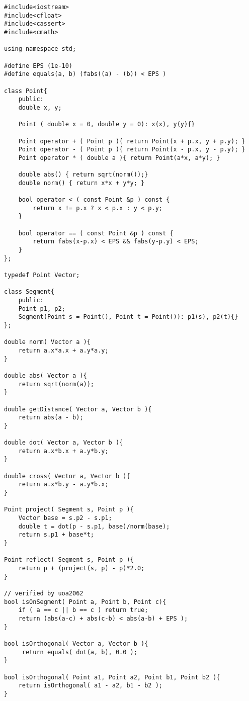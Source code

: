 \begin{verbatim}
#include<iostream>
#include<cfloat>
#include<cassert>
#include<cmath>

using namespace std;

#define EPS (1e-10)
#define equals(a, b) (fabs((a) - (b)) < EPS )

class Point{
    public:
    double x, y;
    
    Point ( double x = 0, double y = 0): x(x), y(y){}
    
    Point operator + ( Point p ){ return Point(x + p.x, y + p.y); }
    Point operator - ( Point p ){ return Point(x - p.x, y - p.y); }
    Point operator * ( double a ){ return Point(a*x, a*y); }

    double abs() { return sqrt(norm());}
    double norm() { return x*x + y*y; }

    bool operator < ( const Point &p ) const {
        return x != p.x ? x < p.x : y < p.y;
    }

    bool operator == ( const Point &p ) const {
        return fabs(x-p.x) < EPS && fabs(y-p.y) < EPS;
    }
};

typedef Point Vector;

class Segment{
    public:
    Point p1, p2;
    Segment(Point s = Point(), Point t = Point()): p1(s), p2(t){}
};

double norm( Vector a ){
    return a.x*a.x + a.y*a.y;
}

double abs( Vector a ){
    return sqrt(norm(a));
}

double getDistance( Vector a, Vector b ){
    return abs(a - b); 
}

double dot( Vector a, Vector b ){
    return a.x*b.x + a.y*b.y;
}

double cross( Vector a, Vector b ){
    return a.x*b.y - a.y*b.x;
}

Point project( Segment s, Point p ){
    Vector base = s.p2 - s.p1;
    double t = dot(p - s.p1, base)/norm(base);
    return s.p1 + base*t;
}

Point reflect( Segment s, Point p ){
    return p + (project(s, p) - p)*2.0;
}

// verified by uoa2062
bool isOnSegment( Point a, Point b, Point c){
    if ( a == c || b == c ) return true;
    return (abs(a-c) + abs(c-b) < abs(a-b) + EPS );
}

bool isOrthogonal( Vector a, Vector b ){
     return equals( dot(a, b), 0.0 );
}

bool isOrthogonal( Point a1, Point a2, Point b1, Point b2 ){
    return isOrthogonal( a1 - a2, b1 - b2 );
}


\end{verbatim}
